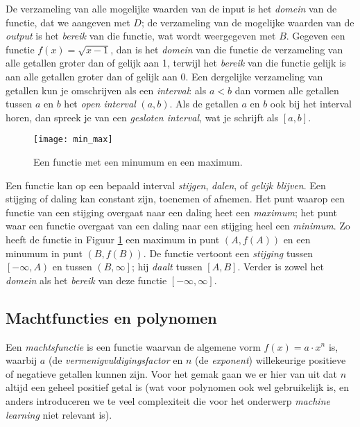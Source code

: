 De verzameling van alle mogelijke waarden van de input is het \textit{domein} van de functie, dat we aangeven met $D$; de verzameling van de mogelijke waarden van de \textit{output} is het \textit{bereik} van die functie, wat wordt weergegeven met $B$. Gegeven een functie $f(x)=\sqrt{x-1}$, dan is het \textit{domein} van die functie de verzameling van alle getallen groter dan of gelijk aan 1, terwijl het \textit{bereik} van die functie gelijk is aan alle getallen groter dan of gelijk aan 0. Een dergelijke verzameling van getallen kun je omschrijven als een \textit{interval}: als $a < b$ dan vormen alle getallen tussen $a$ en $b$ het \textit{open interval} $\left(a,b\right)$. Als de getallen $a$ en $b$ ook bij het interval horen, dan spreek je van een \textit{gesloten interval}, wat je schrijft als $\left[a,b\right]$.

\begin{figure}[h]
\centering
\texttt{[image: min\_max]}
\caption{Een functie met een minumum en een maximum.\label{img:min_max}}
\end{figure}

Een functie kan op een bepaald interval \textit{stijgen}, \textit{dalen}, of \textit{gelijk blijven}. Een stijging of daling kan constant zijn, toenemen of afnemen. Het punt waarop een functie van een stijging overgaat naar een daling heet een \textit{maximum}; het punt waar een functie overgaat van een daling naar een stijging heel een \textit{minimum}. Zo heeft de functie in Figuur \ref{img:min_max} een maximum in punt $(A, f(A))$ en een minumum in punt $(B, f(B))$. De functie vertoont een \textit{stijging} tussen $\left[-\infty, A \right)$ en tussen $\left( B, \infty \right]$; hij \textit{daalt} tussen $\left[A,B\right]$. Verder is zowel het \textit{domein} als het \textit{bereik} van deze functie $\left[-\infty, \infty\right]$.

\subsection{Machtfuncties en polynomen}

Een \textit{machtsfunctie} is een functie waarvan de algemene vorm $f(x)= a \cdot x^n$ is, waarbij $a$ (de \textit{vermenigvuldigingsfactor} en $n$ (de \textit{exponent}) willekeurige positieve of negatieve getallen kunnen zijn. Voor het gemak gaan we er hier van uit dat $n$ altijd een geheel positief getal is (wat voor polynomen ook wel gebruikelijk is, en anders introduceren we te veel complexiteit die voor het onderwerp \textit{machine learning} niet relevant is).

